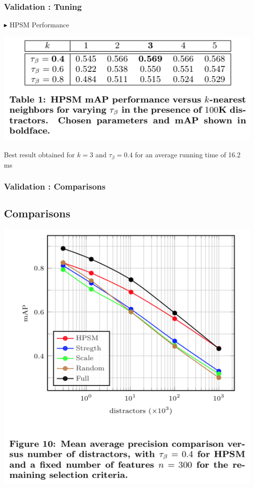 \documentclass[11pt]{beamer}
\begin{document}
\begin{frame}
\frametitle{Validation : Tuning}
$\blacktriangleright$ HPSM Performance
\begin{center}
\includegraphics[scale=0.8]{table1}
\end{center}
Best result obtained for $k = 3$ and $\tau_\beta = 0.4$ for an average running time of 16.2 ms
\end{frame}

\begin{frame}
\frametitle{Validation : Comparisons}
\subsection{Comparisons}
\begin{center}
\includegraphics[scale=0.55]{figure10}
\end{center}

\end{frame}
\end{document}
